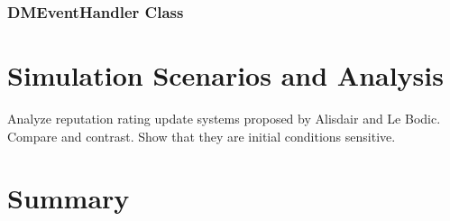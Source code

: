 
\subsubsection{DMEventHandler Class} %
\label{ssub:dmeventhandler_class_dynamic}



\section{Simulation Scenarios and Analysis} %
\label{sec:simulation_scenarios_and_analysis_dynamic}
Analyze reputation rating update systems proposed by Alisdair and Le Bodic. Compare and contrast. Show that they are initial conditions sensitive.

\section{Summary} %
\label{sec:summary_dynamic}


